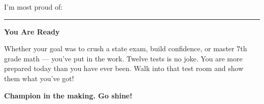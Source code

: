 {\begin{tcolorbox}[
    enhanced,
    colback=funTealLight,
    colframe=funTeal!50,
    arc=10pt,
    boxrule=1.5pt,
    left=6mm, right=6mm, top=5mm, bottom=5mm,
]
\hspace{3mm}\textcolor{funTeal}{\faStar}\hspace{2mm}I'm most proud of: \rule[-2pt]{6cm}{0.5pt}
\end{tcolorbox}

\vspace{3mm}

\begin{tcolorbox}[
    enhanced,
    colback=funGreenLight,
    colframe=funGreen!50,
    arc=10pt,
    boxrule=1pt,
    left=6mm, right=6mm, top=4mm, bottom=4mm,
]
{\bfseries\color{funGreenDark} \faGraduationCap\hspace{2mm}You Are Ready}

\vspace{2mm}

Whether your goal was to crush a state exam, build confidence, or master 7th grade math — you've put in the work. Twelve tests is no joke. You are more prepared today than you have ever been. Walk into that test room and show them what you've got!
\end{tcolorbox}

\vspace{4mm}

\begin{center}
{\large\bfseries\color{funTealDark} \faAward\hspace{2mm}Champion in the making. Go shine!\hspace{2mm}\faAward}
\end{center}

}
\newpage
